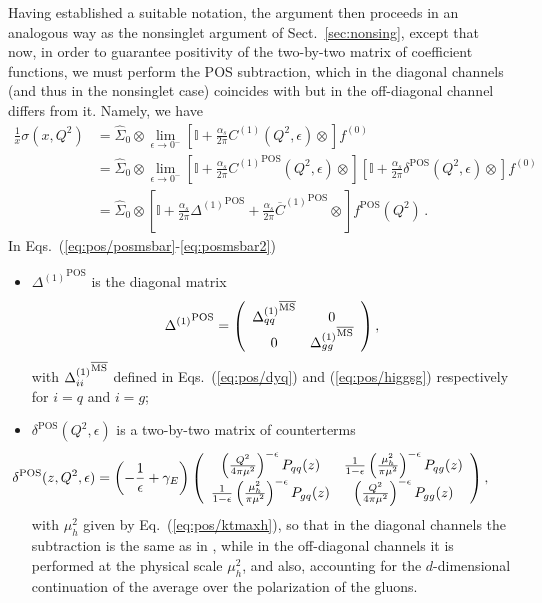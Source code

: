 Having established a suitable notation, the argument then proceeds
in an analogous way as the nonsinglet argument of
Sect.~\ref{sec:nonsing}, except that now, in order to guarantee
positivity of the two-by-two matrix of coefficient functions, we must
perform the POS subtraction, which in the diagonal
channels (and thus in the nonsinglet case) coincides with \msbar{} but
in the off-diagonal channel differs from it.
Namely, we have
\begin{align}
\frac{1}{x} \sigma(x,Q^2)&= \hat \Sigma_0\otimes
\lim_{\epsilon\to
  0^-}\left[\mathbb{I}
    +\frac{\alpha_s}{2\pi} C^{(1)}(Q^2,\epsilon) \otimes\right]
    f^{(0)} \label{eq:pos/posmsbar} \\
&= \hat \Sigma_0\otimes
\lim_{\epsilon\to
  0^-}\left[\mathbb{I}
  +\frac{\alpha_s}{2\pi} {C^{(1)}}^{{\textrm{POS}}}(Q^2,\epsilon) \otimes\right]
\left[\mathbb{I}
    +\frac{\alpha_s}{2\pi} \delta^{{\textrm{POS}}} (Q^2,\epsilon)\otimes\right]
    f^{(0)} \label{eq:pos/posmsbar1} \\
    &=  \hat \Sigma_0\otimes
\left[\mathbb{I}+ \frac{\alpha_s}{2\pi} {\Delta^{(1)}}^{{\textrm{POS}}}
  +\frac{\alpha_s}{2\pi}    {\overline{C}^{(1)}}^{{\textrm{POS}}} \otimes
  \right] 
     f^{{\textrm{POS}}}(Q^2) \,. \label{eq:pos/posmsbar2}
\end{align}
In Eqs.~(\ref{eq:pos/posmsbar}-\ref{eq:posmsbar2})\begin{itemize}
\item $ {\Delta^{(1)}}^{{\textrm{POS}}}$ is the diagonal matrix
\begin{equation}\label{eq:pos/Deltamat}
  {\Delta^{(1)}}^{{\textrm{POS}}}=\left(\begin{array}{cc} {\Delta_{qq}^{(1)}}^{{\overline{\textrm{MS}}}} &
   0 \\0 & {\Delta_{gg}^{(1)}}^{{\overline{\textrm{MS}}}} \end{array}\right),
\end{equation}
with  ${\Delta_{ii}^{(1)}}^{{\overline{\textrm{MS}}}}$ defined in Eqs.~(\ref{eq:pos/dyq}) and
(\ref{eq:pos/higgsg}) respectively for $i=q$ and $i=g$;
\item $\delta^{{\textrm{POS}}} (Q^2,\epsilon)$ is a two-by-two matrix of
  counterterms
\begin{equation}\label{eq:pos/deltamat}
 \hspace*{-3em}\delta^{{\textrm{POS}}} (z,Q^2,\epsilon)= \left(-\frac 1
    {\epsilon}+\gamma_E\right) \left(\begin{array}{cc}  \left(\frac{Q^2}{4\pi
      \mu^2}\right)^{-\epsilon} P_{qq}(z) & \frac{1}{1-\epsilon}\left(\frac{\mu_h^2}{\pi\mu^2}\right)^{-\epsilon} 
  P_{qg}(z)   \\\frac{1}{1-\epsilon}\left(\frac{\mu_h^2}{\pi\mu^2}\right)^{-\epsilon} P_{gq}(z)  & \left(\frac{Q^2}{4\pi
      \mu^2}\right)^{-\epsilon} P_{gg}(z)  \end{array}\right),
\end{equation}
with $\mu_h^2$ given by  Eq.~(\ref{eq:pos/ktmaxh}), so that in the
diagonal channels the subtraction is the same as in \msbar{}, while in
the off-diagonal channels it is performed at the physical scale
$\mu_h^2$, and also, accounting for the $d$-dimensional continuation of
the  average over the polarization of the gluons.
  \end{itemize}

